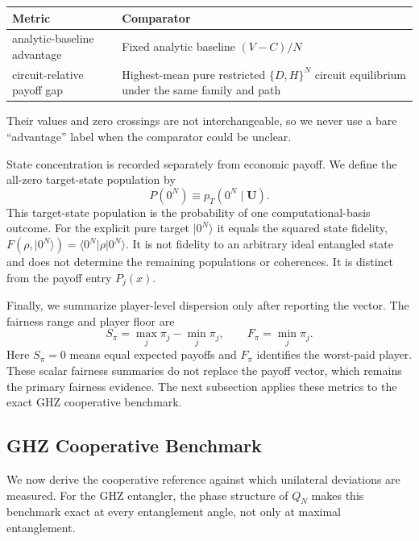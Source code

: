 \documentclass[conference,letterpaper,10pt]{IEEEtran}
\newcommand{\ket}[1]{\ensuremath{|#1\rangle}}
\newcommand{\bra}[1]{\ensuremath{\langle#1|}}
\begin{document}
\begin{center}
\footnotesize
\begin{tabular}{@{}p{}p{}@{}}
\toprule
\textbf{Metric} & \textbf{Comparator}\\
\midrule
analytic-baseline advantage & Fixed analytic baseline $(V-C)/N$\\
circuit-relative payoff gap & Highest-mean pure restricted $\{D,H\}^N$
circuit equilibrium under the same family and path\\
\bottomrule
\end{tabular}
\end{center}
Their values and zero crossings are not interchangeable, so we never use a
bare ``advantage'' label when the comparator could be unclear.

State concentration is recorded separately from economic payoff. We define the
all-zero target-state population by
\begin{equation}
P(0^N)\equiv p_T(0^N\mid\boldsymbol U).
\label{eq:target-population}
\end{equation}
This target-state population is the probability of one computational-basis
outcome. For the explicit pure target $\ket{0^N}$ it equals the squared
state fidelity, $F(\rho,\ket{0^N})=\bra{0^N}\rho\ket{0^N}$.
It is not fidelity to an arbitrary ideal entangled state and does not
determine the remaining populations or coherences. It is distinct from the
payoff entry $P_j(x)$.

Finally, we summarize player-level dispersion only after reporting the vector.
The fairness range and player floor are
\begin{equation}
S_\pi=\max_j\pi_j-\min_j\pi_j,
\qquad
F_\pi=\min_j\pi_j.
\label{eq:fairness-summaries}
\end{equation}
Here $S_\pi=0$ means equal expected payoffs and $F_\pi$ identifies the
worst-paid player. These scalar fairness summaries do not replace the payoff
vector, which remains the primary fairness evidence. The next subsection
applies these metrics to the exact GHZ cooperative benchmark.

\subsection{GHZ Cooperative Benchmark}
\label{sec:ghz-benchmark}

We now derive the cooperative reference against which unilateral deviations
are measured. For the GHZ entangler, the
phase structure of $Q_N$ makes this benchmark exact at every entanglement
angle, not only at maximal entanglement.
\end{document}
